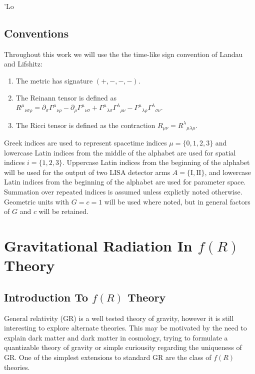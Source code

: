\documentclass[a4paper, 11pt, titlepage, twoside]{report}
\begin{document}
'Lo

\newpage

\section{Conventions}

Throughout this work we will use the the time-like sign convention of Landau and Lifshitz\cite{Landau1975}:
\begin{enumerate}
\item The metric has signature $(+,-,-,-)$.
\item The Reinann tensor is defined as ${R^\mu}_{\nu\sigma\rho} = \partial_\sigma {\Gamma^\mu}_{\nu\rho} - \partial_\rho {\Gamma^\mu}_{\nu\sigma} + {\Gamma^\mu}_{\lambda\sigma}{\Gamma^\lambda}_{\rho\nu} - {\Gamma^\mu}_{\lambda\rho}{\Gamma^\lambda}_{\sigma\nu}$.
\item The Ricci tensor is defined as the contraction $R_{\mu\nu} = {R^\lambda}_{\mu\lambda\mu}$.
\end{enumerate}
Greek indices are used to represent spacetime indices $\mu = \{0,1,2,3\}$ and lowercase Latin indices from the middle of the alphabet are used for spatial indices $i = \{1,2,3\}$. Uppercase Latin indices from the beginning of the alphabet will be used for the output of two LISA detector arms $A = \{\mathrm{I}, \mathrm{II}\}$, and lowercase Latin indices from the beginning of the alphabet are used for parameter space. Summation over repeated indices is assumed unless explictly noted otherwise. Geometric units with $G = c = 1$ will be used where noted, but in general factors of $G$ and $c$ will be retained.

\chapter{Gravitational Radiation In $f(R)$ Theory}

\section{Introduction To $f(R)$ Theory}

General relativity (GR) is a well tested theory of gravity\cite{Will2006}, however it is still interesting to explore alternate theories. This may be motivated by the need to explain dark matter and dark matter in cosmology, trying to formulate a quantizable theory of gravity or simple curiousity regarding the uniqueness of GR. One of the simplest extensions to standard GR are the class of $f(R)$ theories\cite{Sotirou2010, DeFelice2010}.
\end{document}
